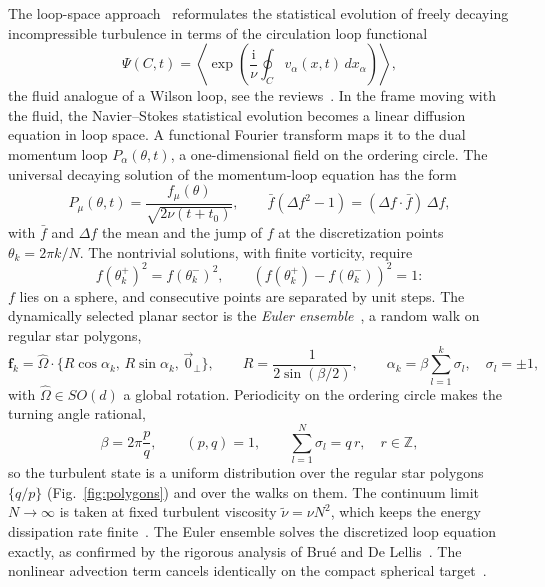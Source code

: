 \documentclass[floatfix,aps,pre,preprint,superscriptaddress,nofootinbib,amsmath,amssymb]{revtex4-2}
\def\I{\mathrm{i}}
\def\VEV#1{\left\langle #1 \right\rangle}
\newcommand{\vect}[1]{\boldsymbol{#1}}
\begin{document}
The loop-space approach~\cite{M93, migdal2023exact, migdal2024quantum} reformulates the statistical evolution of freely
decaying incompressible turbulence in terms of the circulation loop functional
\begin{equation}
    \Psi(C,t)=\VEV{\exp\left(\frac{\I}{\nu}\oint_{C}v_\alpha(x,t)\,dx_\alpha\right)},
    \label{eq:Psi}
\end{equation}
the fluid analogue of a Wilson loop, see the reviews~\cite{ReviewPaperAM, migdal2026Riemann}. In the frame moving with the fluid,
the Navier--Stokes statistical evolution becomes a linear diffusion equation in loop space. A functional Fourier transform
maps it to the dual momentum loop $P_\alpha(\theta,t)$, a one-dimensional field on the ordering circle. The universal decaying
solution of the momentum-loop equation has the form
\begin{equation}
    P_\mu(\theta,t)=\frac{f_\mu(\theta)}{\sqrt{2\nu(t+t_0)}},\qquad
    \bar f\left(\Delta f^2-1\right)=(\Delta f\cdot\bar f)\,\Delta f ,
    \label{eq:Psol}
\end{equation}
with $\bar f$ and $\Delta f$ the mean and the jump of $f$ at the discretization points $\theta_k=2\pi k/N$. The nontrivial
solutions, with finite vorticity, require
\begin{equation}
    f(\theta_k^+)^2=f(\theta_k^-)^2,\qquad \left(f(\theta_k^+)-f(\theta_k^-)\right)^2=1 :
\end{equation}
$f$ lies on a sphere, and consecutive points are separated by unit steps. The dynamically selected planar sector is the
\emph{Euler ensemble}~\cite{migdal2023exact, migdal2024quantum, migdal2026Riemann}, a random walk on regular star polygons,
\begin{equation}
    \vect f_k=\hat\Omega\cdot\{R\cos\alpha_k,\,R\sin\alpha_k,\,\vec 0_\perp\},\qquad
    R=\frac{1}{2\sin(\beta/2)},\qquad
    \alpha_k=\beta\sum_{l=1}^{k}\sigma_l,\quad\sigma_l=\pm1,
    \label{eq:EulerEnsemble}
\end{equation}
with $\hat\Omega\in SO(d)$ a global rotation. Periodicity on the ordering circle makes the turning angle rational,
\begin{equation}
    \beta=2\pi\frac{p}{q},\qquad (p,q)=1,\qquad \sum_{l=1}^{N}\sigma_l=q\,r,\quad r\in\mathbb Z ,
\end{equation}
so the turbulent state is a uniform distribution over the regular star polygons $\{q/p\}$ (Fig.~\ref{fig:polygons}) and over
the walks on them. The continuum limit $N\to\infty$ is taken at fixed turbulent viscosity $\tilde\nu=\nu N^2$, which keeps the
energy dissipation rate finite~\cite{migdal2023exact, ReviewPaperAM}. The Euler ensemble solves the discretized loop equation
exactly, as confirmed by the rigorous analysis of Bru\'e and De Lellis~\cite{DeLellisInprep}. The nonlinear advection term
cancels identically on the compact spherical target~\cite{migdal2026Riemann}.
\end{document}
